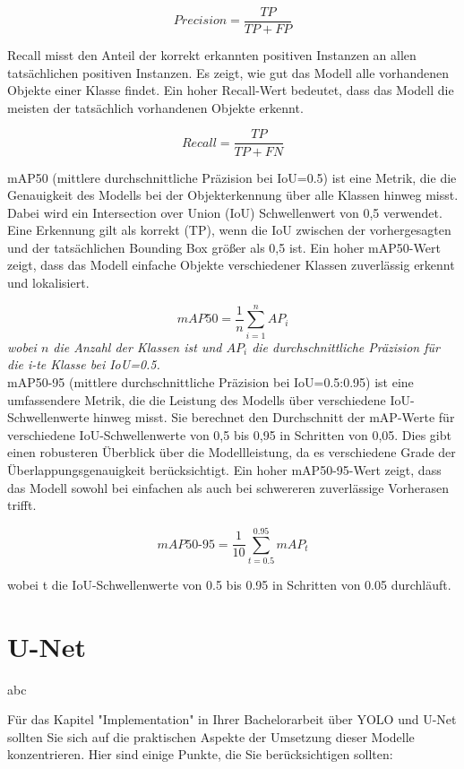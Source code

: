 \[Precision = \frac{TP}{TP + FP}\]

Recall misst den Anteil der korrekt erkannten positiven Instanzen an allen tatsächlichen positiven Instanzen. Es zeigt, wie gut das Modell alle vorhandenen Objekte einer Klasse findet. Ein hoher Recall-Wert bedeutet, dass das Modell die meisten der tatsächlich vorhandenen Objekte erkennt.

\[Recall = \frac{TP}{TP + FN}\]

mAP50 (mittlere durchschnittliche Präzision bei IoU=0.5) ist eine Metrik, die die Genauigkeit des Modells bei der Objekterkennung über alle Klassen hinweg misst. Dabei wird ein Intersection over Union (IoU) Schwellenwert von 0,5 verwendet. Eine Erkennung gilt als korrekt (TP), wenn die IoU zwischen der vorhergesagten und der tatsächlichen Bounding Box größer als 0,5 ist. Ein hoher mAP50-Wert zeigt, dass das Modell einfache Objekte verschiedener Klassen zuverlässig erkennt und lokalisiert.

\[mAP50 = \frac{1}{n} \sum_{i=1}^{n} AP_i\]
\emph{wobei $n$ die Anzahl der Klassen ist und $AP_i$ die durchschnittliche Präzision für die i-te Klasse bei IoU=0.5.}
\\
mAP50-95 (mittlere durchschnittliche Präzision bei IoU=0.5:0.95) ist eine umfassendere Metrik, die die Leistung des Modells über verschiedene IoU-Schwellenwerte hinweg misst. Sie berechnet den Durchschnitt der mAP-Werte für verschiedene IoU-Schwellenwerte von 0,5 bis 0,95 in Schritten von 0,05. Dies gibt einen robusteren Überblick über die Modellleistung, da es verschiedene Grade der Überlappungsgenauigkeit berücksichtigt. Ein hoher mAP50-95-Wert zeigt, dass das Modell sowohl bei einfachen als auch bei schwereren zuverlässige Vorherasen trifft.

\[\mathit{mAP50\mbox{-}95} = \frac{1}{10} \sum_{t=0.5}^{0.95} mAP_t\]

wobei t die IoU-Schwellenwerte von 0.5 bis 0.95 in Schritten von 0.05 durchläuft.



\section{U-Net}
abc




Für das Kapitel "Implementation" in Ihrer Bachelorarbeit über YOLO und U-Net sollten Sie sich auf die praktischen Aspekte der Umsetzung dieser Modelle konzentrieren. Hier sind einige Punkte, die Sie berücksichtigen sollten:

